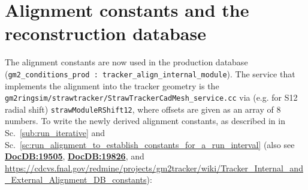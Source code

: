\documentclass[12pt]{article}
\begin{document}
\section{Alignment constants and the reconstruction database}
The alignment constants are now used in the production database \\ (\verb!gm2_conditions_prod : tracker_align_internal_module!). The service that implements the alignment into the tracker geometry is the \\ \verb!gm2ringsim/strawtracker/StrawTrackerCadMesh_service.cc! via (e.g. for S12 radial shift) \verb!strawModuleRShift12!, where offsets are given as an array of 8 numbers. To write the newly derived alignment constants, as described in in Sc.~\ref{sub:run_iterative} and Sc.~\ref{sc:run_alignment_to_establish_constants_for_a_run_interval} (also see \textbf{\href{https://gm2-docdb.fnal.gov/cgi-bin/private/ShowDocument?docid=19505}{DocDB:19505}},  \textbf{\href{https://gm2-docdb.fnal.gov/cgi-bin/private/ShowDocument?docid=19826}{DocDB:19826}}, and \url{https://cdcvs.fnal.gov/redmine/projects/gm2tracker/wiki/Tracker_Internal_and_External_Alignment_DB_constants}):
\end{document}
